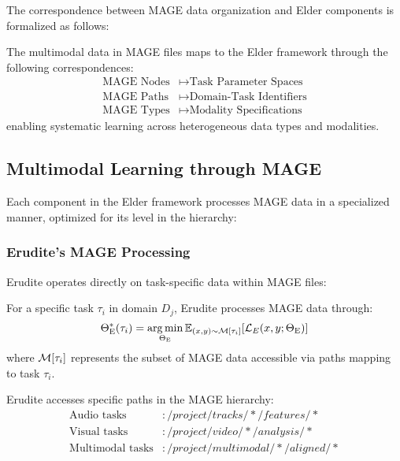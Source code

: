 The correspondence between MAGE data organization and Elder components is formalized as follows:

\begin{proposition}
The multimodal data in MAGE files maps to the Elder framework through the following correspondences:
\begin{align}
\text{MAGE Nodes} &\mapsto \text{Task Parameter Spaces} \\
\text{MAGE Paths} &\mapsto \text{Domain-Task Identifiers} \\
\text{MAGE Types} &\mapsto \text{Modality Specifications}
\end{align}
enabling systematic learning across heterogeneous data types and modalities.
\end{proposition}

\subsection{Multimodal Learning through MAGE}

Each component in the Elder framework processes MAGE data in a specialized manner, optimized for its level in the hierarchy:

\subsubsection{Erudite's MAGE Processing}

Erudite operates directly on task-specific data within MAGE files:

\begin{theorem}
For a specific task $\tau_i$ in domain $D_j$, Erudite processes MAGE data through:
\begin{equation}
\Theta_{\text{E}}^{*}(\tau_i) = \mathop{\mathrm{arg\,min}}_{\Theta_{\text{E}}} \mathbb{E}_{(x,y) \sim \mathcal{M}[\tau_i]} [\mathcal{L}_E(x, y; \Theta_{\text{E}})]
\end{equation}
where $\mathcal{M}[\tau_i]$ represents the subset of MAGE data accessible via paths mapping to task $\tau_i$.
\end{theorem}

Erudite accesses specific paths in the MAGE hierarchy:
\begin{align}
\text{Audio tasks} &: /project/tracks/*/features/* \\
\text{Visual tasks} &: /project/video/*/analysis/* \\
\text{Multimodal tasks} &: /project/multimodal/*/aligned/*
\end{align}

